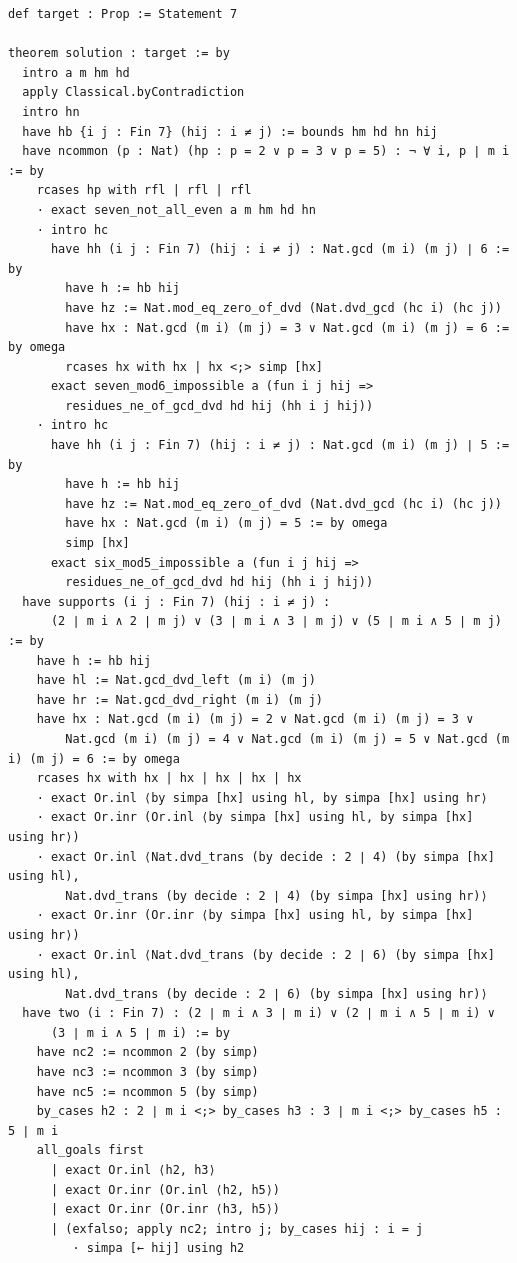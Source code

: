 \documentclass[11pt,a4paper]{article}
\begin{document}
\begin{Verbatim}[breaklines,breakanywhere,fontsize=\footnotesize]
def target : Prop := Statement 7

theorem solution : target := by
  intro a m hm hd
  apply Classical.byContradiction
  intro hn
  have hb {i j : Fin 7} (hij : i ≠ j) := bounds hm hd hn hij
  have ncommon (p : Nat) (hp : p = 2 ∨ p = 3 ∨ p = 5) : ¬ ∀ i, p ∣ m i := by
    rcases hp with rfl | rfl | rfl
    · exact seven_not_all_even a m hm hd hn
    · intro hc
      have hh (i j : Fin 7) (hij : i ≠ j) : Nat.gcd (m i) (m j) ∣ 6 := by
        have h := hb hij
        have hz := Nat.mod_eq_zero_of_dvd (Nat.dvd_gcd (hc i) (hc j))
        have hx : Nat.gcd (m i) (m j) = 3 ∨ Nat.gcd (m i) (m j) = 6 := by omega
        rcases hx with hx | hx <;> simp [hx]
      exact seven_mod6_impossible a (fun i j hij =>
        residues_ne_of_gcd_dvd hd hij (hh i j hij))
    · intro hc
      have hh (i j : Fin 7) (hij : i ≠ j) : Nat.gcd (m i) (m j) ∣ 5 := by
        have h := hb hij
        have hz := Nat.mod_eq_zero_of_dvd (Nat.dvd_gcd (hc i) (hc j))
        have hx : Nat.gcd (m i) (m j) = 5 := by omega
        simp [hx]
      exact six_mod5_impossible a (fun i j hij =>
        residues_ne_of_gcd_dvd hd hij (hh i j hij))
  have supports (i j : Fin 7) (hij : i ≠ j) :
      (2 ∣ m i ∧ 2 ∣ m j) ∨ (3 ∣ m i ∧ 3 ∣ m j) ∨ (5 ∣ m i ∧ 5 ∣ m j) := by
    have h := hb hij
    have hl := Nat.gcd_dvd_left (m i) (m j)
    have hr := Nat.gcd_dvd_right (m i) (m j)
    have hx : Nat.gcd (m i) (m j) = 2 ∨ Nat.gcd (m i) (m j) = 3 ∨
        Nat.gcd (m i) (m j) = 4 ∨ Nat.gcd (m i) (m j) = 5 ∨ Nat.gcd (m i) (m j) = 6 := by omega
    rcases hx with hx | hx | hx | hx | hx
    · exact Or.inl ⟨by simpa [hx] using hl, by simpa [hx] using hr⟩
    · exact Or.inr (Or.inl ⟨by simpa [hx] using hl, by simpa [hx] using hr⟩)
    · exact Or.inl ⟨Nat.dvd_trans (by decide : 2 ∣ 4) (by simpa [hx] using hl),
        Nat.dvd_trans (by decide : 2 ∣ 4) (by simpa [hx] using hr)⟩
    · exact Or.inr (Or.inr ⟨by simpa [hx] using hl, by simpa [hx] using hr⟩)
    · exact Or.inl ⟨Nat.dvd_trans (by decide : 2 ∣ 6) (by simpa [hx] using hl),
        Nat.dvd_trans (by decide : 2 ∣ 6) (by simpa [hx] using hr)⟩
  have two (i : Fin 7) : (2 ∣ m i ∧ 3 ∣ m i) ∨ (2 ∣ m i ∧ 5 ∣ m i) ∨
      (3 ∣ m i ∧ 5 ∣ m i) := by
    have nc2 := ncommon 2 (by simp)
    have nc3 := ncommon 3 (by simp)
    have nc5 := ncommon 5 (by simp)
    by_cases h2 : 2 ∣ m i <;> by_cases h3 : 3 ∣ m i <;> by_cases h5 : 5 ∣ m i
    all_goals first
      | exact Or.inl ⟨h2, h3⟩
      | exact Or.inr (Or.inl ⟨h2, h5⟩)
      | exact Or.inr (Or.inr ⟨h3, h5⟩)
      | (exfalso; apply nc2; intro j; by_cases hij : i = j
         · simpa [← hij] using h2

\end{Verbatim}
\end{document}

